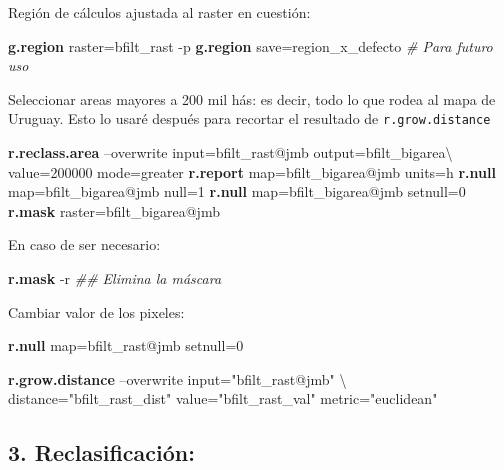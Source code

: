 \documentclass[spanish,]{article}
\newenvironment{Shaded}{}{}
\newcommand{\KeywordTok}[1]{\textcolor[rgb]{0.00,0.44,0.13}{\textbf{{#1}}}}
\newcommand{\StringTok}[1]{\textcolor[rgb]{0.25,0.44,0.63}{{#1}}}
\newcommand{\CommentTok}[1]{\textcolor[rgb]{0.38,0.63,0.69}{\textit{{#1}}}}
\newcommand{\NormalTok}[1]{{#1}}
\begin{document}
Región de cálculos ajustada al raster en cuestión:

\begin{Shaded}
\begin{Highlighting}[]
\KeywordTok{g.region} \NormalTok{raster=bfilt_rast -p}
\KeywordTok{g.region} \NormalTok{save=region_x_defecto }\CommentTok{# Para futuro uso}
\end{Highlighting}
\end{Shaded}

Seleccionar areas mayores a 200 mil hás: es decir, todo lo que rodea al
mapa de Uruguay. Esto lo usaré después para recortar el resultado de
\texttt{r.grow.distance}

\begin{Shaded}
\begin{Highlighting}[]
\KeywordTok{r.reclass.area} \NormalTok{--overwrite input=bfilt_rast@jmb output=bfilt_bigarea\textbackslash{}}
  \NormalTok{value=200000 mode=greater}
\KeywordTok{r.report} \NormalTok{map=bfilt_bigarea@jmb units=h}
\KeywordTok{r.null} \NormalTok{map=bfilt_bigarea@jmb null=1}
\KeywordTok{r.null} \NormalTok{map=bfilt_bigarea@jmb setnull=0}
\KeywordTok{r.mask} \NormalTok{raster=bfilt_bigarea@jmb }
\end{Highlighting}
\end{Shaded}

En caso de ser necesario:

\begin{Shaded}
\begin{Highlighting}[]
\KeywordTok{r.mask} \NormalTok{-r }\CommentTok{## Elimina la máscara}
\end{Highlighting}
\end{Shaded}

Cambiar valor de los pixeles:

\begin{Shaded}
\begin{Highlighting}[]
\KeywordTok{r.null} \NormalTok{map=bfilt_rast@jmb setnull=0}

\KeywordTok{r.grow.distance} \NormalTok{--overwrite input=}\StringTok{"bfilt_rast@jmb"} \NormalTok{\textbackslash{}}
  \NormalTok{distance=}\StringTok{"bfilt_rast_dist"} \NormalTok{value=}\StringTok{"bfilt_rast_val"} \NormalTok{metric=}\StringTok{"euclidean"}
\end{Highlighting}
\end{Shaded}

\subsection{3. Reclasificación:}\label{reclasificaciuxf3n}
\end{document}
